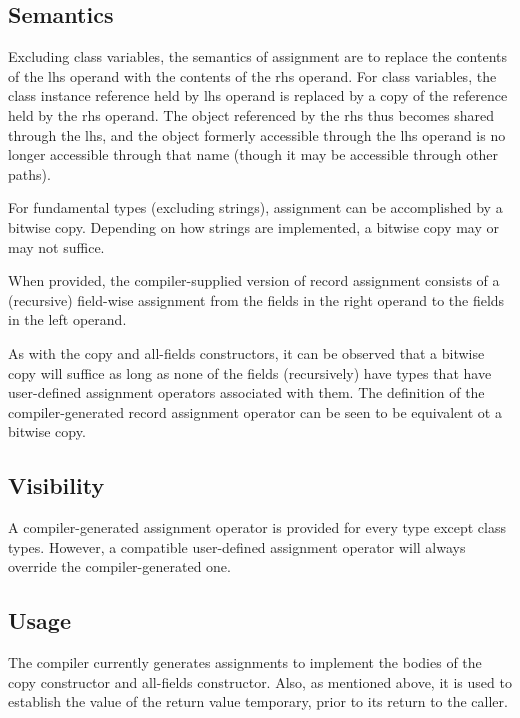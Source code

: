 \subsection{Semantics}

Excluding class variables, the semantics of assignment are to replace the
contents of the lhs operand with the contents of the rhs operand.  For class
variables, the class instance reference held by lhs operand is replaced by a
copy of the reference held by the rhs operand.  The object referenced by the rhs
thus becomes shared through the lhs, and the object formerly accessible through
the lhs operand is no longer accessible through that name (though it may be
accessible through other paths).

For fundamental types (excluding strings),
assignment can be accomplished by a bitwise copy.  
Depending on how strings are implemented, a bitwise copy may or may not suffice.

When provided, the compiler-supplied version of record assignment consists of a
(recursive) field-wise assignment from the fields in the right operand to the
fields in the left operand.

\begin{note}

As with the copy and all-fields constructors, it can be observed that a bitwise
copy will suffice as long as none of the fields (recursively) have types that
have user-defined assignment operators associated with them.  The definition of
the compiler-generated record assignment operator can be seen to be equivalent
ot a bitwise copy.

\end{note}

\subsection{Visibility}

A compiler-generated assignment operator is provided for every type except class
types.  However, a compatible user-defined assignment operator will always
override the compiler-generated one.

\subsection{Usage}

The compiler currently generates assignments to implement the bodies of the copy
constructor and all-fields constructor.  Also, as mentioned above, it is used
to establish the value of the return value temporary, prior to its return to the
caller.

